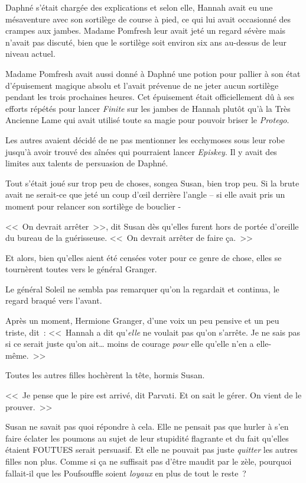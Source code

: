 Daphné s'était chargée des explications et selon elle, Hannah avait eu une mésaventure avec son sortilège de course à pied, ce qui lui avait occasionné des crampes aux jambes. Madame Pomfresh leur avait jeté un regard sévère mais n'avait pas discuté, bien que le sortilège soit environ six ans au-dessus de leur niveau actuel.

Madame Pomfresh avait aussi donné à Daphné une potion pour pallier à son état d'épuisement magique absolu et l'avait prévenue de ne jeter aucun sortilège pendant les trois prochaines heures. Cet épuisement était officiellement dû à ses efforts répétés pour lancer \emph{Finite} sur les jambes de Hannah plutôt qu'à la Très Ancienne Lame qui avait utilisé toute sa magie pour pouvoir briser le \emph{Protego}.

Les autres avaient décidé de ne pas mentionner les ecchymoses sous leur robe jusqu'à avoir trouvé des aînées qui pourraient lancer \emph{Episkey}. Il y avait des limites aux talents de persuasion de Daphné.

Tout s'était joué sur trop peu de choses, songea Susan, bien trop peu. Si la brute avait ne serait-ce que jeté un coup d'œil derrière l'angle -- si elle avait pris un moment pour relancer son sortilège de bouclier -

<<~On devrait arrêter~>>, dit Susan dès qu'elles furent hors de portée d'oreille du bureau de la guérisseuse. <<~On devrait arrêter de faire ça.~>>

Et alors, bien qu'elles aient été censées voter pour ce genre de chose, elles se tournèrent toutes vers le général Granger.

Le général Soleil ne sembla pas remarquer qu'on la regardait et continua, le regard braqué vers l'avant.

Après un moment, Hermione Granger, d'une voix un peu pensive et un peu triste, dit~: <<~Hannah a dit qu'\emph{elle} ne voulait pas qu'on s'arrête. Je ne sais pas si ce serait juste qu'on ait… moins de courage \emph{pour} elle qu'elle n'en a elle-même.~>>

Toutes les autres filles hochèrent la tête, hormis Susan.

<<~Je pense que le pire est arrivé, dit Parvati. Et on sait le gérer. On vient de le prouver.~>>

Susan ne savait pas quoi répondre à cela. Elle ne pensait pas que hurler à s'en faire éclater les poumons au sujet de leur stupidité flagrante et du fait qu'elles étaient FOUTUES serait persuasif. Et elle ne pouvait pas juste \emph{quitter} les autres filles non plus. Comme si ça ne suffisait pas d'être maudit par le zèle, pourquoi fallait-il que les Poufsouffle soient \emph{loyaux} en plus de tout le reste~?

